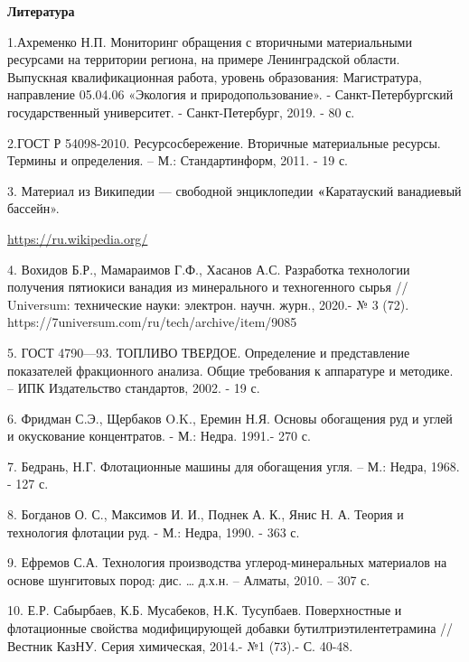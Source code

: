 \begin{center}
{\bfseries Литература}
\end{center}

\begin{noparindent}
1.Ахременко Н.П. Мониторинг обращения с вторичными материальными
ресурсами на территории региона, на примере Ленинградской области.
Выпускная квалификационная работа, уровень образования: Магистратура,
направление 05.04.06 «Экология и природопользование». -
Санкт-Петербургский государственный университет. - Санкт-Петербург,
2019. - 80 с.

2.ГОСТ Р 54098-2010. Ресурсосбережение. Вторичные материальные ресурсы.
Термины и определения. -- М.: Стандартинформ, 2011. - 19 с.

3. Материал из Википедии --- свободной энциклопедии
{\bfseries «}Каратауский ванадиевый бассейн».

\href{https://ru.wikipedia.org/wiki/%D0%9A%D0%B0%D1%80%D0%B0%D1%82%D0%B0%D1%83%D1%81%D0%BA%D0%B8%D0%B9_%D0%B2%D0%B0%D0%BD%D0%B0%D0%B4%D0%B8%D0%B5%D0%B2%D1%8B%D0%B9_%D0%B1%D0%B0%D1%81%D1%81%D0%B5%D0%B9%D0%BD}{https://ru.wikipedia.org/}

4. Вохидов Б.Р., Мамараимов Г.Ф., Хасанов А.С. Разработка технологии
получения пятиокиси ванадия из минерального и техногенного сырья //
Universum: технические науки: электрон. научн. журн., 2020.- № 3 (72).
https://7universum.com/ru/tech/archive/item/9085

5. ГОСТ 4790---93. ТОПЛИВО ТВЕРДОЕ. Определение и представление
показателей фракционного анализа. Общие требования к аппаратуре и
методике. -- ИПК Издательство стандартов, 2002. - 19 с.

6. Фридман С.Э., Щербаков O.K., Еремин Н.Я. Основы обогащения руд и
углей и окускование концентратов. - М.: Недра. 1991.- 270 с.

7. Бедрань, Н.Г. Флотационные машины для обогащения угля. -- М.: Недра,
1968. - 127 с.

8. Богданов О. С., Максимов И. И., Поднек А. К., Янис Н. А. Теория и
технология флотации руд. - М.: Недра, 1990. - 363 с.

9. Ефремов С.А. Технология производства углерод-минеральных материалов
на основе шунгитовых пород: дис. \ldots{} д.х.н. -- Алматы, 2010. -- 307
с.

10. Е.Р. Сабырбаев, К.Б. Мусабеков, Н.К. Тусупбаев. Поверхностные и
флотационные свойства модифицирующей добавки бутилтриэтилентетрамина //
Вестник КазНУ. Серия химическая, 2014.- №1 (73).- С. 40-48.


\end{noparindent}
